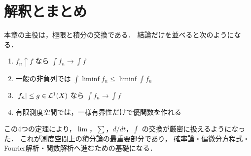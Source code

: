 \section{解釈とまとめ}

本章の主役は，極限と積分の交換である．
結論だけを並べると次のようになる．
\begin{enumerate}
    \item $f_n \uparrow f$ なら $\int f_n \to \int f$
    \item 一般の非負列では $\int \liminf f_n \le \liminf \int f_n$
    \item $|f_n|\le g\in\mathcal L^1(X)$ なら $\int f_n \to \int f$
    \item 有限測度空間では，一様有界性だけで優関数を作れる
\end{enumerate}

この4つの定理により，$\lim$，$\sum$，$d/dt$，$\int$ の交換が厳密に扱えるようになった．
これが測度空間上の積分論の最重要部分であり，
確率論・偏微分方程式・Fourier解析・関数解析へ進むための基礎になる．
